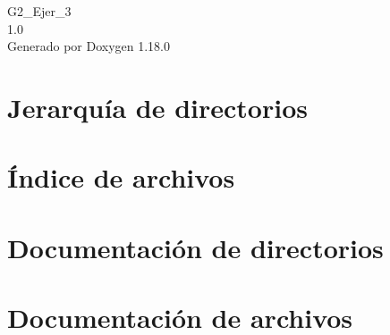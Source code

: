 \documentclass[twoside]{book}
\newcommand{\+}{\discretionary{\mbox{\scriptsize$\hookleftarrow$}}{}{}}
\newcommand{\clearemptydoublepage}{%
    \newpage{\pagestyle{empty}\cleardoublepage}%
  }
\begin{document}
  \raggedbottom
    \hypersetup{pageanchor=false,
                bookmarksnumbered=true,
                pdfencoding=unicode
               }
  \begin{titlepage}
  \vspace*{7cm}
  \begin{center}%
  {\Large G2\+\_\+\+Ejer\+\_\+3}\\
  [1ex]\large 1.\+0 \\
  \vspace*{1cm}
  {\large Generado por Doxygen 1.18.0}\\
  \end{center}
  \end{titlepage}
  \clearemptydoublepage
  \tableofcontents
  \clearemptydoublepage
  \hypersetup{pageanchor=true}

\chapter{Jerarquía de directorios}

\chapter{Índice de archivos}

\chapter{Documentación de directorios}




\chapter{Documentación de archivos}


  \backmatter
  \newpage
  \clearemptydoublepage
  \printindex
\end{document}
